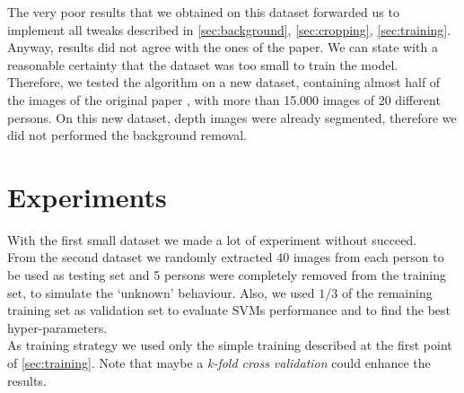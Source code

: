 \documentclass{article}
\begin{document}
The very poor results that we obtained on this dataset forwarded us to
implement all tweaks described in \ref{sec:background}, \ref{sec:cropping},
\ref{sec:training}. Anyway, results did not agree with the ones of the paper.
We can state with a reasonable certainty that the dataset was too small to
train the model.
\\
Therefore, we tested the algorithm on a new dataset, containing almost half of
the images of the original paper \citep{Fanelli2013}, with more than 15.000
images of 20 different persons. On this new dataset, depth images were already
segmented, therefore we did not performed the background removal.

\section{Experiments}
With the first small dataset we made a lot of experiment without succeed.
\\
From the second dataset we randomly extracted 40 images from each person to be
used as testing set and 5 persons were completely removed from the training
set, to simulate the `unknown' behaviour. Also, we used $1/3$ of the remaining
training set as validation set to evaluate SVMs performance and to find the
best hyper-parameters.
\\
As training strategy we used only the simple training described at the first
point of \ref{sec:training}. Note that maybe a \textit{k-fold cross validation}
could enhance the results.
\end{document}
